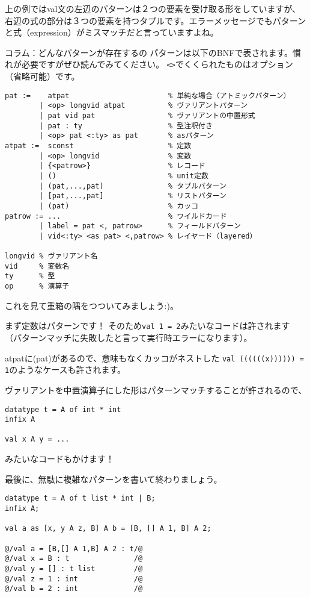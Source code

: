 \documentclass[11pt,a4paper]{article}
\begin{document}
上の例ではval文の左辺のパターンは２つの要素を受け取る形をしていますが、右辺の式の部分は３つの要素を持つタプルです。エラーメッセージでもパターンと式（expression）がミスマッチだと言っていますよね。

\begin{itembox}[l]{コラム：どんなパターンが存在するの}
  パターンは以下のBNFで表されます。慣れが必要ですがぜひ読んでみてください。
  \lstinline{<>}でくくられたものはオプション（省略可能）です。
\begin{Verbatim}
pat :=    atpat                       % 単純な場合（アトミックパターン）
        | <op> longvid atpat          % ヴァリアントパターン
        | pat vid pat                 % ヴァリアントの中置形式
        | pat : ty                    % 型注釈付き
        | <op> pat <:ty> as pat       % asパターン
atpat :=  sconst                      % 定数
        | <op> longvid                % 変数
        | {<patrow>}                  % レコード
        | ()                          % unit定数
        | (pat,...,pat)               % タプルパターン
        | [pat,...,pat]               % リストパターン
        | (pat)                       % カッコ
patrow := ...                         % ワイルドカード
        | label = pat <, patrow>      % フィールドパターン
        | vid<:ty> <as pat> <,patrow> % レイヤード（layered）

longvid % ヴァリアント名
vid     % 変数名
ty      % 型
op      % 演算子
\end{Verbatim}

これを見て重箱の隅をつついてみましょう:)。

まず定数はパターンです！
そのため\lstinline{val 1 = 2}みたいなコードは許されます
（パターンマッチに失敗したと言って実行時エラーになります）。

atpatに(pat)があるので、意味もなくカッコがネストした
\lstinline{val ((((((x)))))) = 1}のようなケースも許されます。

ヴァリアントを中置演算子にした形はパターンマッチすることが許されるので、
\begin{lstlisting}[caption=中置形式のヴァリアントのパターンマッチ]
datatype t = A of int * int
infix A

val x A y = ...
\end{lstlisting}
みたいなコードもかけます！

最後に、無駄に複雑なパターンを書いて終わりましょう。
\begin{lstlisting}[caption=複雑なパターン]
datatype t = A of t list * int | B;
infix A;

val a as [x, y A z, B] A b = [B, [] A 1, B] A 2;

@/val a = [B,[] A 1,B] A 2 : t/@
@/val x = B : t               /@
@/val y = [] : t list         /@
@/val z = 1 : int             /@
@/val b = 2 : int             /@
\end{lstlisting}
\end{itembox}
\end{document}
